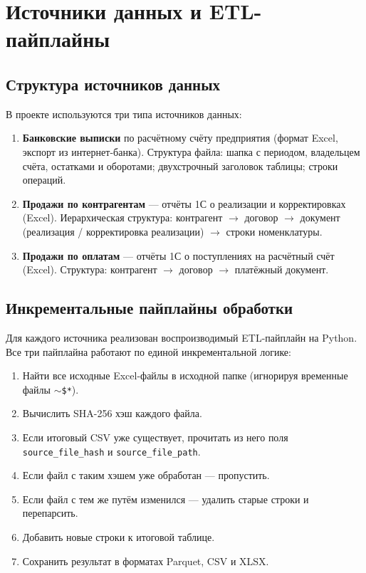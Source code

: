 \section{Источники данных и ETL-пайплайны}

\subsection{Структура источников данных}

В проекте используются три типа источников данных:
\begin{enumerate}
  \item \textbf{Банковские выписки} по расчётному счёту предприятия (формат Excel, экспорт из интернет-банка). Структура файла: шапка с периодом, владельцем счёта, остатками и оборотами; двухстрочный заголовок таблицы; строки операций.
  \item \textbf{Продажи по контрагентам} --- отчёты 1С о реализации и корректировках (Excel). Иерархическая структура: контрагент $\to$ договор $\to$ документ (реализация / корректировка реализации) $\to$ строки номенклатуры.
  \item \textbf{Продажи по оплатам} --- отчёты 1С о поступлениях на расчётный счёт (Excel). Структура: контрагент $\to$ договор $\to$ платёжный документ.
\end{enumerate}

\subsection{Инкрементальные пайплайны обработки}

Для каждого источника реализован воспроизводимый ETL-пайплайн на Python. Все три пайплайна работают по единой инкрементальной логике:
\begin{enumerate}
  \item Найти все исходные Excel-файлы в исходной папке (игнорируя временные файлы \texttt{$\sim$\$*}).
  \item Вычислить SHA-256 хэш каждого файла.
  \item Если итоговый CSV уже существует, прочитать из него поля \texttt{source\_file\_hash} и \texttt{source\_file\_path}.
  \item Если файл с таким хэшем уже обработан --- пропустить.
  \item Если файл с тем же путём изменился --- удалить старые строки и перепарсить.
  \item Добавить новые строки к итоговой таблице.
  \item Сохранить результат в форматах Parquet, CSV и XLSX.
\end{enumerate}

